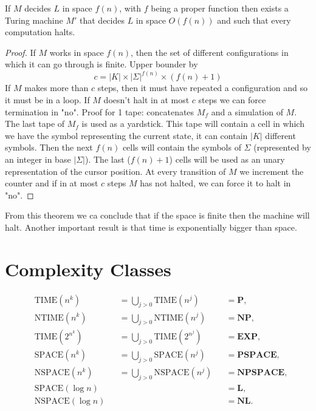 \documentclass[12pt]{article}
\begin{document}
\begin{defbox}
If $M$ decides $L$ in space $f(n)$, with $f$ being a proper function then exists a Turing machine $M'$ that decides $L$ in space $O(f(n))$ and such that every computation halts.
\end{defbox}
\begin{proof}
  If $M$ works in space $f(n)$, then the set of different configurations in which it can go through is finite. 
  Upper bounder by 
  $$c=|K|\times|\Sigma|^{f(n)}\times (f(n)+1)$$
  If $M$ makes more than $c$ steps, then it must have repeated a configuration and so it must be in a loop. If $M$ doesn't halt in at most $c$ steps we can force termination in "no".
  Proof for 1 tape: concatenates $M_f$ and a simulation of $M$. The last tape of $M_f$ is used as a yardstick. This tape will contain a cell in which we have the symbol representing the current state, it can contain $|K|$ different symbols. Then the next $f(n)$ cells will contain the symbols of $\Sigma$ (represented by an integer in base $|\Sigma|$). The last ($f(n)+1$) cells will be used as an unary representation of the cursor position.
  At every transition of $M$ we increment the counter and if in at most $c$ steps $M$ has not halted, we can force it to halt in "no".
\end{proof}

From this theorem we ca conclude that if the space is finite then the machine will halt. Another important result is that time is exponentially bigger than space. 

\section{Complexity Classes}
\[
\begin{aligned}
    &\text{TIME}(n^k) && = \bigcup_{j > 0} \text{TIME}(n^j)  &&= \textbf{P}, \\
    &\text{NTIME}(n^k) && = \bigcup_{j > 0} \text{NTIME}(n^j)  &&= \textbf{NP}, \\
    &\text{TIME}(2^{n^k}) && = \bigcup_{j > 0} \text{TIME}(2^{n^j})  &&= \textbf{EXP}, \\
    &\text{SPACE}(n^k) && = \bigcup_{j > 0} \text{SPACE}(n^j)  &&= \textbf{PSPACE}, \\
    &\text{NSPACE}(n^k) && = \bigcup_{j > 0} \text{NSPACE}(n^j) && = \textbf{NPSPACE}, \\
    &\text{SPACE}(\log n) &&&& = \textbf{L}, \\
    &\text{NSPACE}(\log n) &&&& = \textbf{NL}.
\end{aligned}
\]
\end{document}
